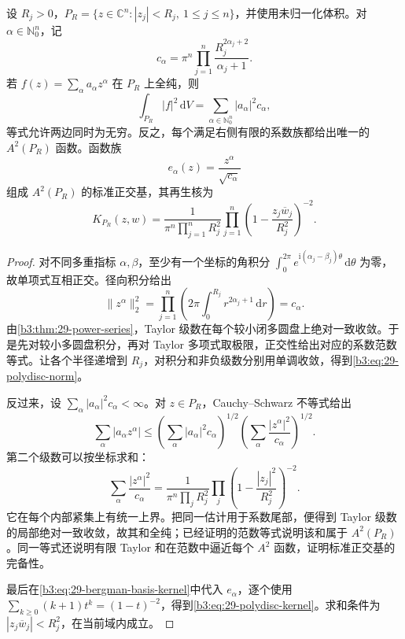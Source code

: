 \begin{theorem}\label{b3:thm:29-polydisc-bergman}
设 \(R_j>0\)，\(P_R=\{z\in\mathbb C^n:|z_j|<R_j,\ 1\le j\le n\}\)，并使用未归一化体积。对 \(\alpha\in\mathbb N_0^n\)，记
\[
 c_\alpha=\pi^n\prod_{j=1}^n\frac{R_j^{2\alpha_j+2}}{\alpha_j+1}.
\]
若 \(f(z)=\sum_\alpha a_\alpha z^\alpha\) 在 \(P_R\) 上全纯，则
\begin{equation}\label{b3:eq:29-polydisc-norm}
 \int_{P_R}|f|^2\,\mathrm{d}V
 =\sum_{\alpha\in\mathbb N_0^n}|a_\alpha|^2c_\alpha,
\end{equation}
等式允许两边同时为无穷。反之，每个满足右侧有限的系数族都给出唯一的 \(A^2(P_R)\) 函数。函数族
\[
 e_\alpha(z)=\frac{z^\alpha}{\sqrt{c_\alpha}}
\]
组成 \(A^2(P_R)\) 的标准正交基，其再生核为
\begin{equation}\label{b3:eq:29-polydisc-kernel}
 K_{P_R}(z,w)=\frac1{\pi^n\prod_{j=1}^nR_j^2}
 \prod_{j=1}^n\left(1-\frac{z_j\overline w_j}{R_j^2}\right)^{-2}.
\end{equation}
\end{theorem}
\begin{proof}
对不同多重指标 \(\alpha,\beta\)，至少有一个坐标的角积分 \(\int_0^{2\pi}e^{\mathrm{i}(\alpha_j-\beta_j)\theta}\,\mathrm{d}\theta\) 为零，故单项式互相正交。径向积分给出
\[
 \|z^\alpha\|_2^2
 =\prod_{j=1}^n\left(2\pi\int_0^{R_j}r^{2\alpha_j+1}\,\mathrm{d}r\right)
 =c_\alpha.
\]
由\cref{b3:thm:29-power-series}，Taylor 级数在每个较小闭多圆盘上绝对一致收敛。于是先对较小多圆盘积分，再对 Taylor 多项式取极限，正交性给出对应的系数范数等式。让各个半径递增到 \(R_j\)，对积分和非负级数分别用单调收敛，得到\eqref{b3:eq:29-polydisc-norm}。

反过来，设 \(\sum_\alpha|a_\alpha|^2c_\alpha<\infty\)。对 \(z\in P_R\)，Cauchy--Schwarz 不等式给出
\[
 \sum_\alpha|a_\alpha z^\alpha|
 \le\left(\sum_\alpha|a_\alpha|^2c_\alpha\right)^{1/2}
      \left(\sum_\alpha\frac{|z^\alpha|^2}{c_\alpha}\right)^{1/2}.
\]
第二个级数可以按坐标求和：
\[
 \sum_\alpha\frac{|z^\alpha|^2}{c_\alpha}
 =\frac1{\pi^n\prod_jR_j^2}
   \prod_j\left(1-\frac{|z_j|^2}{R_j^2}\right)^{-2}.
\]
它在每个内部紧集上有统一上界。把同一估计用于系数尾部，便得到 Taylor 级数的局部绝对一致收敛，故其和全纯；已经证明的范数等式说明该和属于 \(A^2(P_R)\)。同一等式还说明有限 Taylor 和在范数中逼近每个 \(A^2\) 函数，证明标准正交基的完备性。

最后在\eqref{b3:eq:29-bergman-basis-kernel}中代入 \(e_\alpha\)，逐个使用
\(\sum_{k\ge0}(k+1)t^k=(1-t)^{-2}\)，得到\eqref{b3:eq:29-polydisc-kernel}。求和条件为 \(|z_j\overline w_j|<R_j^2\)，在当前域内成立。
\end{proof}

